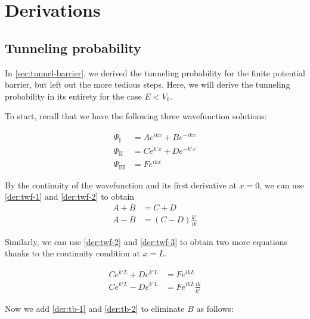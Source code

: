 

%

\chapter{Derivations} \label{ch:deriv}
\section{Tunneling probability}  \label{sec:tunnel-deriv}
In \autoref{sec:tunnel-barrier}, we derived the tunneling probability for the finite potential barrier, but left out the more tedious steps. 
Here, we will derive the tunneling probability in its entirety for the case $E < V_0$. 

To start, recall that we have the following three wavefunction solutions:

\begin{align}
	\Psi_{\text{I}} &= Ae^{ikx} + Be^{-ikx} \label{der:twf-1} \\
	\Psi_{\text{II}} &= Ce^{k'x} + De^{-k'x} \label{der:twf-2} \\
	\Psi_{\text{III}} &= Fe^{ikx} \label{der:twf-3}
\end{align}

By the continuity of the wavefunction and its first derivative at $x=0$, we can use \autoref{der:twf-1} and \ref{der:twf-2} to obtain
\begin{align}
	A + B &= C + D \label{der:tb-1} \\
	A - B &= (C - D)\frac{k'}{ik} \label{der:tb-2}
\end{align}

Similarly, we can use \autoref{der:twf-2} and \ref{der:twf-3} to obtain two more equations thanks to the continuity condition at $x=L$.

\begin{align}
	Ce^{k'L} + De^{k'L} &= Fe^{ikL} \label{der:tb-3} \\
	Ce^{k'L} - De^{k'L} &= Fe^{ikL}\frac{ik}{k'} \label{der:tb-4}
\end{align}

Now we add \autoref{der:tb-1} and \ref{der:tb-2} to eliminate $B$ as follows:

